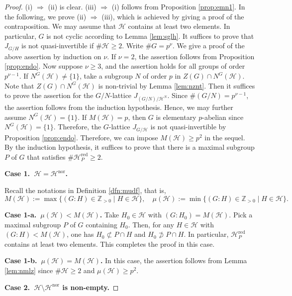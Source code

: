 \documentclass[12pt]{amsart}
\theoremstyle{plain}
\theoremstyle{definition}
\numberwithin{thm}{section}
\numberwithin{equation}{section}
\newcommand{\Zpn}{\mathbb{Z}_{>0}}
\newcommand{\cH}{\mathcal{H}}
\DeclareMathOperator{\red}{red}
\DeclareMathOperator{\nor}{nor}
\begin{document}
\begin{proof}
(i) $\Rightarrow$ (ii) is clear. (iii) $\Rightarrow$ (i) follows from Proposition \ref{prop:emn1}. In the following, we prove (ii) $\Rightarrow$ (iii), which is achieved by giving a proof of the contraposition. We may assume that $\cH$ contains at least two elements. In particular, $G$ is not cyclic according to Lemma \ref{lem:sglh}. It suffices to prove that $J_{G/H}$ is not quasi-invertible if $\#\cH \geq 2$. Write $\#G=p^{\nu}$. We give a proof of the above assertion by induction on $\nu$. If $\nu=2$, the assertion follows from Proposition \ref{prop:endo}. Now suppose $\nu \geq 3$, and the assertion holds for all groups of order $p^{\nu-1}$. If $N^{G}(\cH)\neq \{1\}$, take a subgroup $N$ of order $p$ in $Z(G)\cap N^{G}(\cH)$. Note that $Z(G)\cap N^{G}(\cH)$ is non-trivial by Lemma \ref{lem:nznt}. Then it suffices to prove the assertion for the $G/N$-lattice $J_{(G/N)/\cH^{N}}$. Since $\#(G/N)=p^{\nu-1}$, the assertion follows from the induction hypothesis. Hence, we may further assume $N^{G}(\cH)=\{1\}$. If $M(\cH)=p$, then $G$ is elementary $p$-abelian since $N^{G}(\cH)=\{1\}$. Therefore, the $G$-lattice $J_{G/\cH}$ is not quasi-invertible by Proposition \ref{prop:endo}. Therefore, we can impose $M(\cH)\geq p^{2}$ in the sequel. By the induction hypothesis, it suffices to prove that there is a maximal subgroup $P$ of $G$ that satisfies $\#\cH_{P}^{\red}\geq 2$. 

\textbf{Case 1.~$\cH=\cH^{\nor}$. }

Recall the notations in Definition \ref{dfn:mudf}, that is,
\begin{equation*}
M(\cH):=\max\{(G:H)\in \Zpn \mid H\in \cH\},\quad \mu(\cH):=\min\{(G:H)\in \Zpn \mid H\in \cH\}. 
\end{equation*}

\textbf{Case 1-a.~$\mu(\cH)<M(\cH)$. }
Take $H_{0}\in \cH$ with $(G:H_{0})=M(\cH)$. Pick a maximal subgroup $P$ of $G$ containing $H_{0}$. Then, for any $H\in \cH$ with $(G:H)<M(\cH)$, one has $H_{0}\not\subset P\cap H$ and $H_{0}\not\supset P\cap H$. In particular, $\cH_{P}^{\red}$ contains at least two elements. This completes the proof in this case. 

\textbf{Case 1-b.~$\mu(\cH)=M(\cH)$. }
In this case, the assertion follows from Lemma \ref{lem:nmlz} since $\#\cH \geq 2$ and $\mu(\cH)\geq p^{2}$. 

\textbf{Case 2.~$\cH\setminus \cH^{\nor}$ is non-empty. }


\end{proof}
\end{document}
